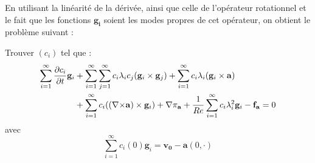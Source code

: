 En utilisant la linéarité de la dérivée, ainsi que celle de l'opérateur rotationnel et le fait que les fonctions $\bm{g_i}$ soient les modes propres de cet opérateur, on obtient le problème suivant :
\begin{pb}\label{pbc}
Trouver $(c_i)$ tel que :
\begin{align*}
\sum_{i=1}^\infty\frac{\partial c_i}{\partial t}\mathbf{g}_i &+ \sum_{i=1}^\infty\sum_{j=1}^\infty c_i\lambda_ic_j(\mathbf{g}_i\times \mathbf{g}_j) + \sum_{i=1}^\infty c_i\lambda_i(\mathbf{g}_i\times \mathbf{a})\\
& + \sum_{i=1}^\infty c_i(({\nabla\times}\mathbf{a})\times \mathbf{g}_i) + {\nabla} \pi_{\mathbf{a}} +\frac{1}{Re}\sum_{i=1}^\infty c_i\lambda_i^2\mathbf{g}_i - \mathbf{f_a} = 0\\
\end{align*}
avec \[ \sum_{i=1}^\infty c_i(0)\mathbf{g}_i = \mathbf{v_0}-\mathbf{a}(0,\cdot) \]
\end{pb}


